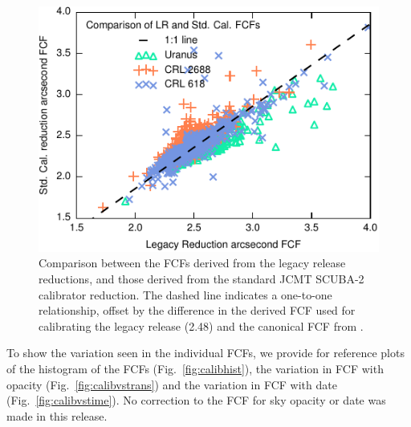 \documentclass[twocolumn]{aastex6}
\begin{document}
\begin{figure}
\includegraphics{legacyFCF-caldbFCF-scatter.pdf}
\caption{Comparison between the FCFs derived from the legacy release
  reductions, and those derived from the standard JCMT SCUBA-2
  calibrator reduction. The dashed line indicates a one-to-one
  relationship, offset by the difference in the derived FCF used for
  calibrating the legacy release (2.48) and the canonical FCF from
  \citet[2.34]{Dempsey2013}. \label{fig:lr-caldb-scatter} }
\end{figure}


To show the variation seen in the individual FCFs, we provide for
reference plots of the histogram of the FCFs
(Fig.~\ref{fig:calibhist}), the variation in FCF with opacity
(Fig.~\ref{fig:calibvstrans}) and the variation in FCF with date
(Fig.~\ref{fig:calibvstime}). No correction to the FCF for sky opacity or date
was made in this release.
\end{document}
